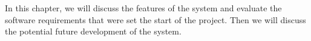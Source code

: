 In this chapter, we will discuss the features of the system and evaluate the software requirements that were set the
start of the project.
Then we will discuss the potential future development of the system.
